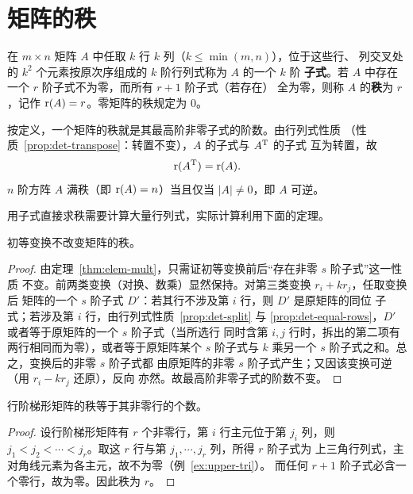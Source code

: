 \section{矩阵的秩}\label{sec:rank}

\begin{definition}\label{def:rank}
在 $m\times n$ 矩阵 $A$ 中任取 $k$ 行 $k$ 列（$k\le\min(m,n)$），位于这些行、
列交叉处的 $k^2$ 个元素按原次序组成的 $k$ 阶行列式称为 $A$ 的一个 $k$ 阶
\textbf{子式}。若 $A$ 中存在一个 $r$ 阶子式不为零，而所有 $r+1$ 阶子式（若存在）
全为零，则称 $A$ 的\textbf{秩}为 $r$，记作 $\operatorname{r}(A)=r$。零矩阵的秩规定为
$0$。
\end{definition}

按定义，一个矩阵的秩就是其最高阶非零子式的阶数。由行列式性质
（性质~\ref{prop:det-transpose}：转置不变），$A$ 的子式与 $A^{\mathrm{T}}$ 的子式
互为转置，故
\[
  \operatorname{r}(A^{\mathrm{T}})=\operatorname{r}(A).
\]
$n$ 阶方阵 $A$ 满秩（即 $\operatorname{r}(A)=n$）当且仅当 $|A|\neq 0$，即 $A$ 可逆。

用子式直接求秩需要计算大量行列式，实际计算利用下面的定理。

\begin{theorem}\label{thm:rank-invariant}
初等变换不改变矩阵的秩。
\end{theorem}
\begin{proof}
由定理~\ref{thm:elem-mult}，只需证初等变换前后“存在非零 $s$ 阶子式”这一性质
不变。前两类变换（对换、数乘）显然保持。对第三类变换 $r_i+kr_j$，任取变换后
矩阵的一个 $s$ 阶子式 $D'$：若其行不涉及第 $i$ 行，则 $D'$ 是原矩阵的同位
子式；若涉及第 $i$ 行，由行列式性质~\ref{prop:det-split} 与
\ref{prop:det-equal-rows}，$D'$ 或者等于原矩阵的一个 $s$ 阶子式（当所选行
同时含第 $i,j$ 行时，拆出的第二项有两行相同而为零），或者等于原矩阵某个
$s$ 阶子式与 $k$ 乘另一个 $s$ 阶子式之和。总之，变换后的非零 $s$ 阶子式都
由原矩阵的非零 $s$ 阶子式产生；又因该变换可逆（用 $r_i-kr_j$ 还原），反向
亦然。故最高阶非零子式的阶数不变。
\end{proof}

\begin{theorem}\label{thm:rank-echelon}
行阶梯形矩阵的秩等于其非零行的个数。
\end{theorem}
\begin{proof}
设行阶梯形矩阵有 $r$ 个非零行，第 $i$ 行主元位于第 $j_i$ 列，则
$j_1<j_2<\cdots<j_r$。取这 $r$ 行与第 $j_1,\cdots,j_r$ 列，所得 $r$ 阶子式为
上三角行列式，主对角线元素为各主元，故不为零（例~\ref{ex:upper-tri}）。
而任何 $r+1$ 阶子式必含一个零行，故为零。因此秩为 $r$。
\end{proof}


